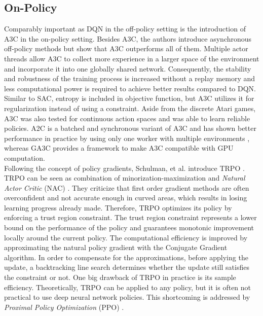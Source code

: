     \subsection{On-Policy}
    \label{sec:on-policy}
	Comparably important as DQN in the off-policy setting is the introduction of A3C \cite{Mnih2016} in the on-policy setting.
   	Besides A3C, the authors introduce asynchronous off-policy methods but show that A3C outperforms all of them.
   	Multiple actor threads allow A3C to collect more experience in a larger space of the environment and incorporate it into one globally shared network.
   	Consequently, the stability and robustness of the training process is increased without a replay memory and less computational power is required to achieve better results compared to DQN.
	Similar to SAC, entropy is included in objective function, but A3C utilizes it for regularization instead of using a constraint.
	Aside from the discrete Atari games, A3C was also tested for continuous action spaces and was able to learn reliable policies. 
	A2C \cite{Mnih2016} is a batched and synchronous variant of A3C and has shown better performance in practice by using only one worker with multiple environments \cite{Wu2017}, whereas GA3C \cite{Babaeizadeh2017} provides a framework to make A3C compatible with GPU computation.\\
    Following the concept of policy gradients, Schulman, et al. introduce TRPO \cite{Schulman2015}.
    TRPO can be seen as combination of minorization-maximization \cite{Hunter2004} and \textit{Natural Actor Critic} (NAC) \cite{Peters2008}.
    They criticize that first order gradient methods are often overconfident and not accurate enough in curved areas, which results in losing learning progress already made. 
    Therefore, TRPO optimizes its policy by enforcing a trust region constraint. 
    The trust region constraint represents a lower bound on the performance of the policy and guarantees monotonic improvement locally around the current policy.	
    The computational efficiency is improved by approximating the natural policy gradient \cite{Kakade2001} with the Conjugate Gradient algorithm.
    In order to compensate for the approximations, before applying the update, a backtracking line search determines whether the update still satisfies the constraint or not. 
    One big drawback of TRPO in practice is its sample efficiency. 
    Theoretically, TRPO can be applied to any policy, but it is often not practical to use deep neural network policies.
    This shortcoming is addressed by \textit{Proximal Policy Optimization} (PPO) \cite{Schulman2017}.
